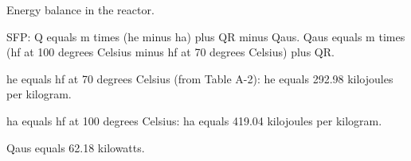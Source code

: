 Energy balance in the reactor.  

SFP: Q equals m times (he minus ha) plus QR minus Qaus.  
Qaus equals m times (hf at 100 degrees Celsius minus hf at 70 degrees Celsius) plus QR.  

he equals hf at 70 degrees Celsius (from Table A-2):  
he equals 292.98 kilojoules per kilogram.  

ha equals hf at 100 degrees Celsius:  
ha equals 419.04 kilojoules per kilogram.  

Qaus equals 62.18 kilowatts.